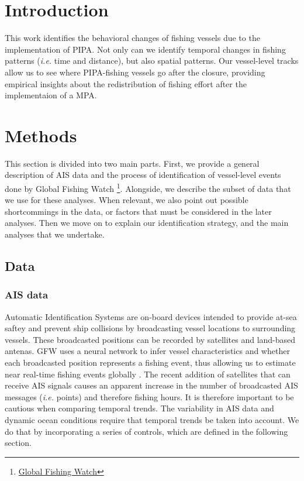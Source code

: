 \documentclass[]{article}
\let\rmarkdownfootnote\footnote%
\def\footnote{\protect\rmarkdownfootnote}
\begin{document}
\clearpage

\section{Introduction}\label{introduction}

This work identifies the behavioral changes of fishing vessels due to
the implementation of PIPA. Not only can we identify temporal changes in
fishing patterns (\emph{i.e.} time and distance), but also spatial
patterns. Our vessel-level tracks allow us to see where PIPA-fishing
vessels go after the closure, providing empirical insights about the
redistribution of fishing effort after the implementaion of a MPA.

\section{Methods}\label{methods}

This section is divided into two main parts. First, we provide a general
description of AIS data and the process of identification of
vessel-level events done by Global Fishing Watch \footnote{\href{globalfishingwatch.org}{Global
  Fishing Watch}}. Alongside, we describe the subset of data that we use
for these analyses. When relevant, we also point out possible
shortcommings in the data, or factors that must be considered in the
later analyses. Then we move on to explain our identification strategy,
and the main analyses that we undertake.

\subsection{Data}\label{data}

\subsubsection{AIS data}\label{ais-data}

Automatic Identification Systems are on-board devices intended to
provide at-sea saftey and prevent ship collisions by broadcasting vessel
locations to surrounding vessels. These broadcasted positions can be
recorded by satellites and land-based antenas. GFW uses a neural network
to infer vessel characteristics and whether each broadcasted position
represents a fishing event, thus allowing us to estimate near real-time
fishing events globally \citep{kroodsma_2018}. The recent addition of
satellites that can receive AIS signals causes an apparent increase in
the number of broadcasted AIS messages (\emph{i.e.} points) and
therefore fishing hours. It is therefore important to be cautious when
comparing temporal trends. The variability in AIS data and dynamic ocean
conditions require that temporal trends be taken into account. We do
that by incorporating a series of controls, which are defined in the
following section.
\end{document}
